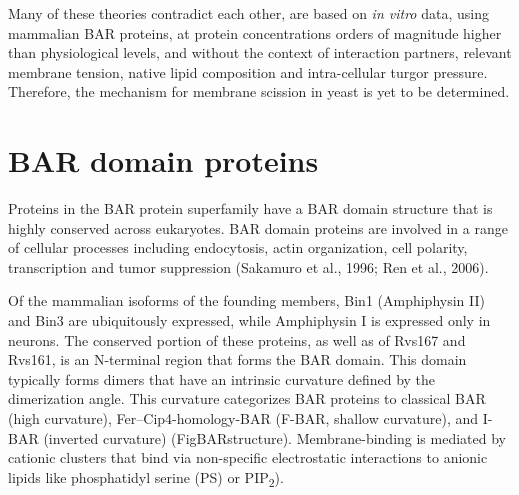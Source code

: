 			\vspace{5mm}
Many of these theories contradict each other, are based on \textit{in vitro} data, using mammalian BAR proteins, at protein concentrations orders of magnitude higher than physiological levels, and without the context of interaction partners, relevant membrane tension, native lipid composition and intra-cellular turgor pressure. Therefore, the mechanism for membrane scission in yeast is yet to be determined. 

 





		
\section{BAR domain proteins}
	
Proteins in the BAR protein superfamily have a BAR domain structure that is highly conserved across eukaryotes. BAR domain proteins are involved in a range of cellular processes including endocytosis, actin organization, cell polarity, transcription and tumor suppression (Sakamuro et al., 1996; Ren et al., 2006). 

Of the mammalian isoforms of the founding members, Bin1 (Amphiphysin II) and Bin3 are ubiquitously expressed, while Amphiphysin I is expressed only in neurons. The conserved portion of these proteins, as well as of Rvs167 and Rvs161, is an N-terminal region that forms the BAR domain. This domain typically forms dimers that have an intrinsic curvature defined by the dimerization angle. This curvature categorizes BAR proteins to classical BAR (high curvature), Fer–Cip4-homology-BAR (F-BAR, shallow curvature), and I-BAR (inverted curvature) (FigBARstructure). Membrane-binding is mediated by cationic clusters that bind via non-specific electrostatic interactions to anionic lipids like phosphatidyl serine (PS) or PIP\textsubscript{2}).

\vspace{3mm}

